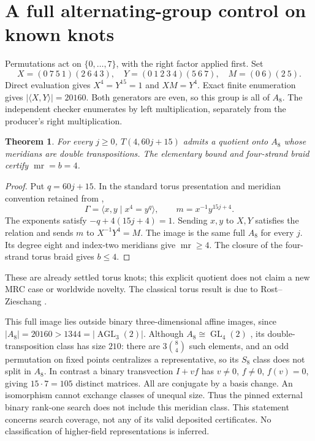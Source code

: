 \documentclass[11pt]{article}
\newtheorem{theorem}{Theorem}
\newcommand{\mr}{\operatorname{mr}}
\begin{document}
\section{A full alternating-group control on known knots}

Permutations act on $\{0,\ldots,7\}$, with the right factor
applied first. Set
\[
 X=(0\ 7\ 5\ 1)(2\ 6\ 4\ 3),\quad
 Y=(0\ 1\ 2\ 3\ 4)(5\ 6\ 7),\quad
 M=(0\ 6)(2\ 5).
\]
Direct evaluation gives $X^4=Y^{15}=1$ and $XM=Y^4$.
Exact finite enumeration gives $|\langle X,Y\rangle|=20160$.
Both generators are even, so this group is all of $A_8$.
The independent checker enumerates by left multiplication,
separately from the producer's right multiplication.

\begin{theorem}
For every $j\ge0$, $T(4,60j+15)$ admits a quotient onto $A_8$
whose meridians are double transpositions. The elementary
bound and four-strand braid certify $\mr=b=4$.
\end{theorem}
\begin{proof}
Put $q=60j+15$. In the standard torus presentation and meridian
convention retained from \cite[Section 5.1]{cornwell},
\[
 \Gamma=\langle x,y\mid x^4=y^q\rangle,\qquad
 m=x^{-1}y^{15j+4}.
\]
The exponents satisfy $-q+4(15j+4)=1$. Sending $x,y$ to $X,Y$
satisfies the relation and sends $m$ to $X^{-1}Y^4=M$.
The image is the same full $A_8$ for every $j$. Its degree
eight and index-two meridians give $\mr\ge4$. The closure of
the four-strand torus braid gives $b\le4$.
\end{proof}

These are already settled torus knots; this explicit quotient
does not claim a new MRC case or worldwide novelty. The
classical torus result is due to Rost--Zieschang \cite{rz}.

This full image lies outside binary three-dimensional affine
images, since $|A_8|=20160>1344=|\operatorname{AGL}_3(2)|$.
Although $A_8\cong\operatorname{GL}_4(2)$ \cite{atlas}, its
double-transposition class has size $210$: there are
$3\binom84$ such elements, and an odd permutation on fixed
points centralizes a representative, so its $S_8$ class does
not split in $A_8$. In contrast a binary transvection
$I+vf$ has $v\ne0$, $f\ne0$, $f(v)=0$, giving $15\cdot7=105$
distinct matrices. All are conjugate by a basis change.
An isomorphism cannot exchange classes of unequal size.
Thus the pinned external binary rank-one search does not
include this meridian class. This statement concerns search
coverage, not any of its valid deposited certificates.
No classification of higher-field representations is inferred.
\end{document}
